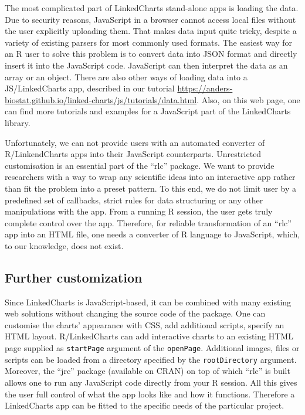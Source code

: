 \documentclass[twocolumn,10pt]{article}
\begin{document}
The most complicated part of LinkedCharts stand-alone apps is loading the data. Due to security reasons, JavaScript in a browser cannot access local files without the user explicitly uploading them. That makes data input quite tricky, despite a variety of existing parsers for most commonly used formats. The easiest way for an R user to solve this problem is to convert data into JSON format and directly insert it into the JavaScript code. JavaScript can then interpret the data as an array or an object. There are also other ways of loading data into a JS/LinkedCharts app, described in our tutorial \url{https://anders-biostat.github.io/linked-charts/js/tutorials/data.html}. Also, on this web page, one can find more tutorials and examples for a JavaScript part of the LinkedCharts library.

Unfortunately, we can not provide users with an automated converter of R/LinkendCharts apps into their JavaScript counterparts. Unrestricted customisation is an essential part of the ``rlc'' package. We want to provide researchers with a way to wrap any scientific ideas into an interactive app rather than fit the problem into a preset pattern. To this end, we do not limit user by a predefined set of callbacks, strict rules for data structuring or any other manipulations with the app. From a running R session, the user gets truly complete control over the app. Therefore, for reliable transformation of an ``rlc'' app into an HTML file, one needs a converter of R language to JavaScript, which, to our knowledge, does not exist.

\subsection{Further customization}

Since LinkedCharts is JavaScript-based, it can be combined with many existing web solutions without changing the source code of the package. One can customise the charts' appearance with CSS, add additional scripts, specify an HTML layout. R/LinkedCharts can add interactive charts to an existing HTML page supplied as \texttt{startPage} argument of the \texttt{openPage}. Additional images, files or scripts can be loaded from a directory specified by the \texttt{rootDirectory} argument. Moreover, the ``jrc'' package (available on CRAN) on top of which ``rlc'' is built allows one to run any JavaScript code directly from your R session. All this gives the user full control of what the app looks like and how it functions. Therefore a LinkedCharts app can be fitted to the specific needs of the particular project.
\end{document}
